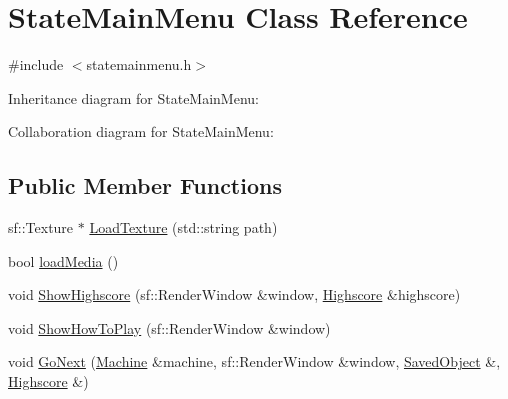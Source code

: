 \hypertarget{classStateMainMenu}{}\section{State\+Main\+Menu Class Reference}
\label{classStateMainMenu}


{\ttfamily \#include $<$statemainmenu.\+h$>$}



Inheritance diagram for State\+Main\+Menu\+:


Collaboration diagram for State\+Main\+Menu\+:
\subsection*{Public Member Functions}
\begin{DoxyCompactItemize}
\item 
sf\+::\+Texture $\ast$ \hyperlink{classStateMainMenu_abf976d139c7276e7f354e9ecc7fb9e06}{Load\+Texture} (std\+::string path)
\item 
bool \hyperlink{classStateMainMenu_a5556c573c81a77614b5d4d4dfe9dd4ed}{load\+Media} ()
\item 
void \hyperlink{classStateMainMenu_a62d95bde455b83436f28a76d7ead0fd3}{Show\+Highscore} (sf\+::\+Render\+Window \&window, \hyperlink{classHighscore}{Highscore} \&highscore)
\item 
void \hyperlink{classStateMainMenu_ab6b48304f4697b5a0eca285bc6d7d087}{Show\+How\+To\+Play} (sf\+::\+Render\+Window \&window)
\item 
void \hyperlink{classStateMainMenu_a868e9a3bcd1b6392491e06b706dc4925}{Go\+Next} (\hyperlink{classMachine}{Machine} \&machine, sf\+::\+Render\+Window \&window, \hyperlink{classSavedObject}{Saved\+Object} \&, \hyperlink{classHighscore}{Highscore} \&)
\end{DoxyCompactItemize}
